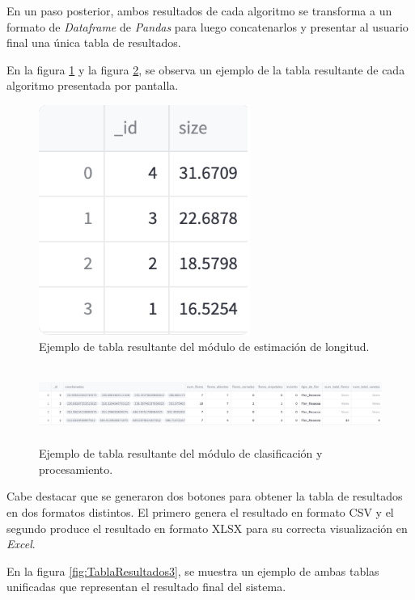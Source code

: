 En un paso posterior, ambos resultados de cada algoritmo se transforma a un formato de \textit{Dataframe} de \textit{Pandas} para luego concatenarlos y presentar al usuario final una única tabla de resultados.

En la figura \ref{fig:TablaResultados1} y la figura \ref{fig:TablaResultados2}, se observa un ejemplo de la tabla resultante de cada algoritmo presentada por pantalla.

\begin{figure}[ht]
	\centering
	\includegraphics[scale= 0.3]{./Figures/Tabla1.png}
	\caption{Ejemplo de tabla resultante del módulo de estimación de longitud.}
	\label{fig:TablaResultados1}
\end{figure}

\begin{figure}[ht]
	\centering
	\includegraphics[width= 12cm, height= 2.5cm]{./Figures/Tabla2.png}
	\caption{Ejemplo de tabla resultante del módulo de clasificación y procesamiento.}
	\label{fig:TablaResultados2}
\end{figure}

Cabe destacar que se generaron dos botones para obtener la tabla de resultados en dos formatos distintos. El primero genera el resultado en formato CSV y el segundo produce el resultado en formato XLSX para su correcta visualización en \textit{Excel}. 

En la figura \ref{fig:TablaResultados3}, se muestra un ejemplo de ambas tablas unificadas que representan el resultado final del sistema.

